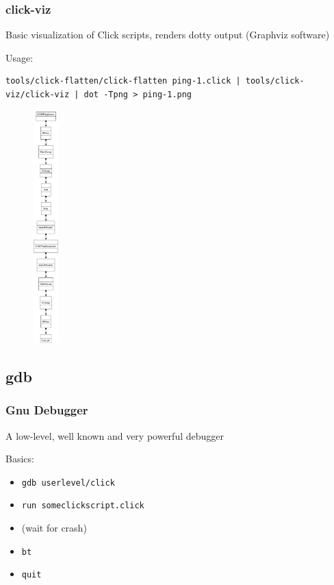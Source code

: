\documentclass{beamer}
\begin{document}
\begin{frame}[fragile]
\frametitle{click-viz}
\begin{minipage}[t]{0.7\linewidth}

Basic visualization of Click scripts, renders dotty output (Graphviz software)

Usage:
\begin{lstlisting}[basicstyle=\footnotesize]
tools/click-flatten/click-flatten ping-1.click | tools/click-viz/click-viz | dot -Tpng > ping-1.png
\end{lstlisting}

\end{minipage}
\begin{minipage}[t]{0.15\linewidth}
\begin{figure}[t]
	\centering
	\includegraphics[width=1cm]{figures/clickvizcropped.pdf}
\end{figure}
\end{minipage}

\end{frame}

\subsection{gdb} %
\label{sub:gdb}

\begin{frame}
\frametitle{Gnu Debugger}
A low-level, well known and very powerful debugger

Basics:
\begin{itemize}
	\item \lstinline!gdb userlevel/click!
	\item \lstinline!run someclickscript.click!
	\item (wait for crash)
	\item \lstinline!bt!
	\item \lstinline!quit!
\end{itemize}
\end{frame}
\end{document}
